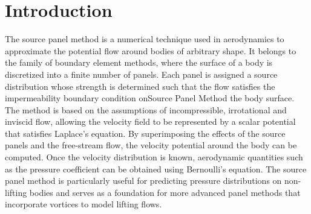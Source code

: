 \section{Introduction}
\label{sec:introduction}

The source panel method is a numerical technique used in aerodynamics to approximate the potential flow around bodies of
arbitrary shape.
It belongs to the family of boundary element methods, where the surface of a body is discretized into a finite number of
panels.
Each panel is assigned a source distribution whose strength is determined such that the flow satisfies the
impermeability boundary condition onSource Panel Method the body surface.
The method is based on the assumptions of incompressible, irrotational and inviscid flow, allowing the velocity field to
be represented by a scalar potential that satisfies Laplace's equation.
By superimposing the effects of the source panels and the free-stream flow, the velocity potential around the body can
be computed.
Once the velocity distribution is known, aerodynamic quantities such as the pressure coefficient can be obtained using
Bernoulli's equation.
The source panel method is particularly useful for predicting pressure distributions on non-lifting bodies and serves as
a foundation for more advanced panel methods that incorporate vortices to model lifting flows.